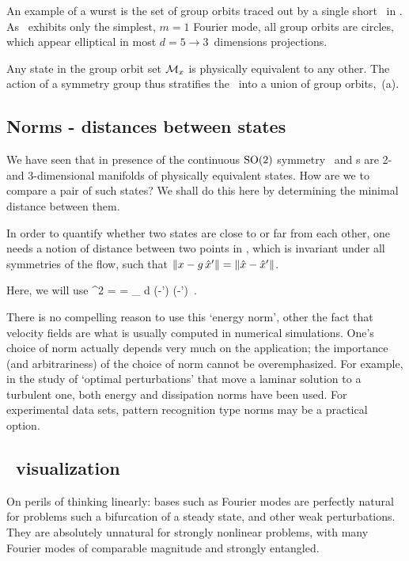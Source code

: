 An example of a wurst is the set of group orbits traced out by a single
short \rpo\ in . As \cLe\ exhibits only the simplest,
$m=1$ Fourier mode, all group orbits are circles, which appear elliptical in
most $d=5 \to 3$~dimensions projections.
    \color{black}\fi

Any state in the  group orbit set ${\cal M}_{x}$
is physically equivalent to any other. The action of a symmetry group
thus stratifies the \statesp\ into a union of group orbits,
\,{(a)}.

\subsection{Norms - distances between states}

We have seen that in presence of the continuous $\textrm{SO}(2)$ symmetry
\reqva\ and \rpo s are 2- and 3-dimensional manifolds of physically
equivalent states. How are we to compare a pair of such states? We shall
do this here by determining the minimal distance between them.

In order to quantify
whether two states are close to or far from each other, one
needs a notion of distance between two points in \statesp, which
is invariant under all symmetries of the flow, such that
$\|{x-g\,{\hat{x}'}}\|=\|{\hat{x}-{\hat{x}'}}\|$.

Here, we will use
\beq
  ^2  =  =
\int_\bCell \! d \bx \;
(-') \cdot (-')
\,.

There is no compelling reason to use this {`energy norm'}, other the fact that
velocity fields are what is usually computed in numerical simulations. One's choice
of norm actually depends very much on the application; the importance (and arbitrariness)
of the choice of norm cannot be overemphasized. For example, in the study of
`optimal perturbations' that move a laminar solution to a turbulent one, both energy
\citep{TeHaHe10} and dissipation \citep{LoCaCoPeGo11} norms have been
used. For experimental data sets, pattern recognition type norms may be a practical option.

\subsection{\Statesp\ visualization}

On perils of thinking linearly: bases such as Fourier modes are
perfectly natural for problems such a bifurcation of a steady state, and
other weak perturbations. They are absolutely unnatural for strongly
nonlinear problems, with many Fourier modes of comparable magnitude and
strongly entangled.

